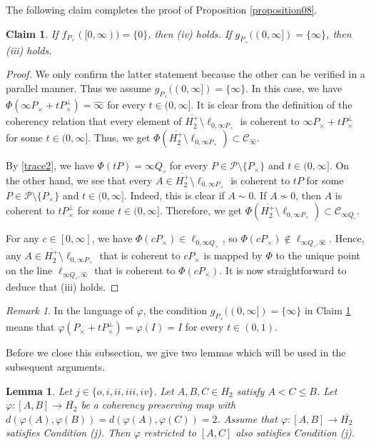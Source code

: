 \documentclass[10pt]{amsart}
\newtheorem{lemma}[theorem]{Lemma}
\newtheorem{claim}[theorem]{Claim}
\theoremstyle{definition}
\theoremstyle{remark}
\newtheorem{remark}[theorem]{Remark}
\numberwithin{subsection}{section}
\numberwithin{equation}{section}
\newcommand\cC{{\mathcal{C}}}
\newcommand\cP{{\mathcal{P}}}
\newcommand\oH{{\overline{H_2}}}
\newcommand\oHp{{\overline{H_2^+}}}
\newcommand\oi{{\widehat{\infty}}}
\begin{document}
The following claim completes the proof of Proposition \ref{proposition08}.
\begin{claim}\label{saigo}
If $f_{P_\times}([0, \infty))=\{0\}$, then (iv) holds.
If $g_{P_\times}((0, \infty])=\{\infty\}$, then (iii) holds.
\end{claim}
\begin{proof}
We only confirm the latter statement because the other can be verified in a parallel manner.
Thus we assume $g_{P_\times}((0, \infty])=\{\infty\}$.
In this case, we have  $\Phi(\infty P_\times+ tP_\times^\perp)=\oi$ for every $t\in (0, \infty]$. 
It is clear from the definition of the coherency relation that every element of $\oHp \setminus  \ell_{0, \infty P_\times}$ is coherent to $\infty P_\times+ tP_\times^\perp$ for some $t\in (0,\infty]$. 
Thus, we get $\Phi(\oHp \setminus  \ell_{0, \infty P_\times})\subset \cC_{\oi}$.

By \eqref{trace2}, we have $\Phi(tP)=\infty Q_\circ$ for every $P\in \cP\setminus \{P_\times\}$ and $t\in (0, \infty]$.
On the other hand, we see that every $A\in\oHp \setminus  \ell_{0, \infty P_\times}$ is coherent to $tP$ for some $P\in \cP\setminus \{P_\times\}$ and $t\in (0, \infty]$. 
Indeed, this is clear if $A\sim 0$. 
If $A\not\sim 0$, then $A$ is coherent to $tP_\times^\perp$ for some $t\in (0,\infty]$. 
Therefore, we get $\Phi(\oHp \setminus  \ell_{0, \infty P_\times})\subset \cC_{\infty Q_\circ}$.

For any $c \in [0, \infty]$, we have $\Phi (cP_\times) \in \ell_{0, \infty Q_\times}$, so $\Phi (cP_\times) \not\in  \ell_{\infty Q_{\circ}, {\oi}}$. Hence, any $A \in \oHp \setminus  \ell_{0, \infty P_\times}$ that is coherent to $cP_\times$ is mapped by $\Phi$ to the unique point on the line $ \ell_{\infty Q_{\circ}, {\oi}}$ that is coherent to $\Phi (cP_\times)$.
It is now straightforward to deduce that (iii) holds.  
\end{proof}

\begin{remark}\label{saigo2}
In the language of $\varphi$, the condition $g_{P_\times}((0, \infty])=\{\infty\}$ in Claim \ref{saigo} means that $\varphi(P_\times +tP_\times^\perp) =\varphi(I)=I$ for every $t\in (0,1)$.
\end{remark}



Before we close this subsection, we give two lemmas which will be used in the subsequent arguments.
\begin{lemma}\label{ABC}
Let $j\in \{o, i, ii, iii, iv\}$.
Let $A, B, C\in H_2$ satisfy $A<C\leq B$. 
Let $\varphi\colon [A, B]\to \oH$ be a coherency preserving map with $d(\varphi(A), \varphi(B))=d(\varphi(A), \varphi(C))=2$.
Assume that $\varphi\colon [A, B]\to \oH$ satisfies Condition (j). 
Then $\varphi$ restricted to $[A, C]$ also satisfies Condition (j). 
\end{lemma}
\end{document}
